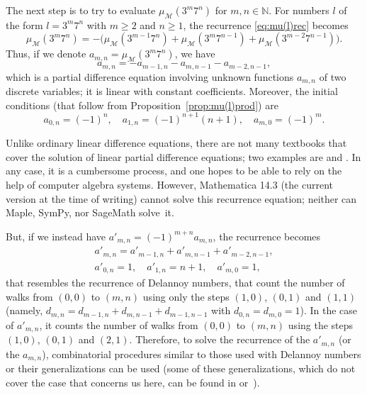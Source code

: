 \documentclass[11pt, a4paper]{article}
\newcommand{\N}{\mathbb{N}}
\newcommand{\calM}{\mathcal{M}}
\newcommand{\muM}{\mu_\calM}
\theoremstyle{plain}
\theoremstyle{definition}
\begin{document}
The next step is to try to evaluate $\muM(3^m7^n)$ for $m,n \in \N$.
For numbers $l$ of the form $l=3^m7^n$ with $m \ge 2$ and $n \ge 1$, the recurrence \eqref{eq:mu(l)rec} becomes 
\[
  \muM(3^m7^n) = -\Big( \muM(3^{m-1}7^n) + \muM(3^m7^{n-1}) + \muM(3^{m-2}7^{n-1}) \Big).
\]
Thus, if we denote $a_{m,n} = \muM(3^m7^n)$, we have 
\begin{equation*}
  a_{m,n} = -a_{m-1,n}-a_{m,n-1}-a_{m-2,n-1},
\end{equation*}
which is a partial difference equation involving unknown functions $a_{m,n}$ of two discrete variables; it is linear with constant coefficients.
Moreover, the initial conditions (that follow from Proposition~\ref{prop:mu(l)prod}) are
\begin{equation*}
  a_{0,n} = (-1)^n, \quad
  a_{1,n} = (-1)^{n+1}(n+1), \quad
  a_{m,0} = (-1)^m.
\end{equation*}

Unlike ordinary linear difference equations, there are not many textbooks that cover the solution of linear partial difference equations; two examples are \cite[Chapter~5]{Mick} and \cite[Section 2.3]{PeWil}. In any case, it is a cumbersome process, and one hopes to be able to rely on the help of computer algebra systems. However, Mathematica 14.3 (the current version at the time of writing) cannot solve this recurrence equation; neither can Maple, SymPy, nor SageMath solve~it.

But, if we instead have $a'_{m,n} = (-1)^{m+n} a_{m,n}$, the recurrence becomes
\begin{equation}
\label{eq:a'}
\begin{gathered}
  a'_{m,n} = a'_{m-1,n}+a'_{m,n-1}+a'_{m-2,n-1}, \\
  a'_{0,n} = 1, \quad
  a'_{1,n} = n+1, \quad
  a'_{m,0} = 1,
\end{gathered}
\end{equation}
that resembles the recurrence of Delannoy numbers, that count the number of walks from $(0,0)$ to $(m,n)$ using only the steps $(1,0)$, $(0,1)$ and $(1,1)$ (namely, $d_{m,n} = d_{m-1,n}+d_{m,n-1}+d_{m-1,n-1}$ with $d_{0,n}=d_{m,0}=1$). 
In the case of $a'_{m,n}$, it counts the number of walks from $(0,0)$ to $(m,n)$ using the steps $(1,0)$, $(0,1)$ and $(2,1)$. 
Therefore, to solve the recurrence of the $a'_{m,n}$ (or the $a_{m,n}$), combinatorial procedures similar to those used with Delannoy numbers or their generalizations can be used (some of these generalizations, which do not cover the case that concerns us here, can be found in \cite{EdGr} or~\cite{GOV}).
\end{document}

